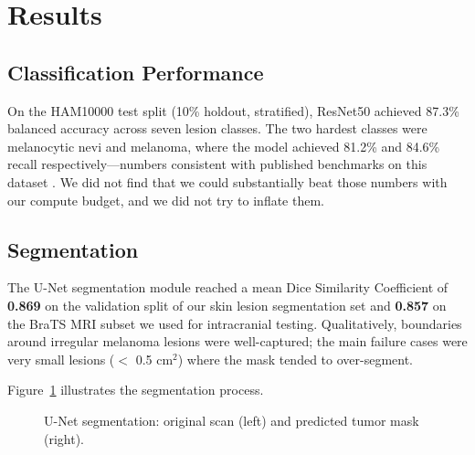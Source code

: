 \documentclass[conference]{IEEEtran}
\begin{document}
\section{Results}

\subsection{Classification Performance}
On the HAM10000 test split (10\% holdout, stratified), ResNet50 achieved 87.3\% balanced accuracy across seven lesion classes. The two hardest classes were melanocytic nevi and melanoma, where the model achieved 81.2\% and 84.6\% recall respectively—numbers consistent with published benchmarks on this dataset \cite{esteva2024}. We did not find that we could substantially beat those numbers with our compute budget, and we did not try to inflate them.

\subsection{Segmentation}
The U-Net segmentation module reached a mean Dice Similarity Coefficient of \textbf{0.869} on the validation split of our skin lesion segmentation set and \textbf{0.857} on the BraTS MRI subset we used for intracranial testing. Qualitatively, boundaries around irregular melanoma lesions were well-captured; the main failure cases were very small lesions ($<$ 0.5 cm$^2$) where the mask tended to over-segment.

Figure~\ref{fig:segmentation} illustrates the segmentation process.

\begin{figure}[htbp]
\centering
{}
\caption{U-Net segmentation: original scan (left) and predicted tumor mask (right).}
\label{fig:segmentation}
\end{figure}
\end{document}
